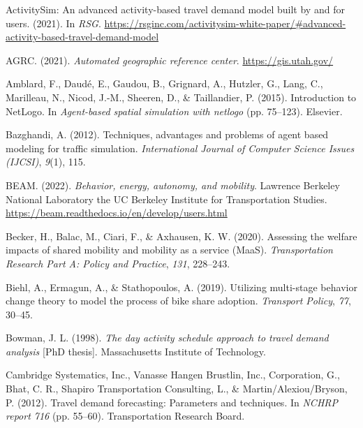\documentclass[fancy, masters]{byuthesis}
\newlength{\cslhangindent}
\newlength{\cslentryspacingunit} %
\newenvironment{CSLReferences}[2] %
 {%
  \setlength{\parindent}{0pt}
  \ifodd #1
  \let\oldpar\par
  \def\par{\hangindent=\cslhangindent\oldpar}
  \fi
  \setlength{\parskip}{#2\cslentryspacingunit}
 }%
 {}
\begin{document}
\hypertarget{refs}{}
\begin{CSLReferences}{1}{0}
\leavevmode{}%
ActivitySim: An advanced activity-based travel demand model built by and for users. (2021). In \emph{RSG}. \url{https://rsginc.com/activitysim-white-paper/\#advanced-activity-based-travel-demand-model}

\leavevmode{}%
AGRC. (2021). \emph{Automated geographic reference center}. \url{https://gis.utah.gov/}

\leavevmode{}%
Amblard, F., Daudé, E., Gaudou, B., Grignard, A., Hutzler, G., Lang, C., Marilleau, N., Nicod, J.-M., Sheeren, D., \& Taillandier, P. (2015). Introduction to NetLogo. In \emph{Agent-based spatial simulation with netlogo} (pp. 75--123). Elsevier.

\leavevmode{}%
Bazghandi, A. (2012). Techniques, advantages and problems of agent based modeling for traffic simulation. \emph{International Journal of Computer Science Issues (IJCSI)}, \emph{9}(1), 115.

\leavevmode{}%
BEAM. (2022). \emph{Behavior, energy, autonomy, and mobility}. Lawrence Berkeley National Laboratory the UC Berkeley Institute for Transportation Studies. \url{https://beam.readthedocs.io/en/develop/users.html}

\leavevmode{}%
Becker, H., Balac, M., Ciari, F., \& Axhausen, K. W. (2020). Assessing the welfare impacts of shared mobility and mobility as a service (MaaS). \emph{Transportation Research Part A: Policy and Practice}, \emph{131}, 228--243.

\leavevmode{}%
Biehl, A., Ermagun, A., \& Stathopoulos, A. (2019). Utilizing multi-stage behavior change theory to model the process of bike share adoption. \emph{Transport Policy}, \emph{77}, 30--45.

\leavevmode{}%
Bowman, J. L. (1998). \emph{The day activity schedule approach to travel demand analysis} {[}PhD thesis{]}. Massachusetts Institute of Technology.

\leavevmode{}%
Cambridge Systematics, Inc., Vanasse Hangen Brustlin, Inc., Corporation, G., Bhat, C. R., Shapiro Transportation Consulting, L., \& Martin/Alexiou/Bryson, P. (2012). Travel demand forecasting: Parameters and techniques. In \emph{NCHRP report 716} (pp. 55--60). Transportation Research Board.


\end{CSLReferences}
\end{document}
